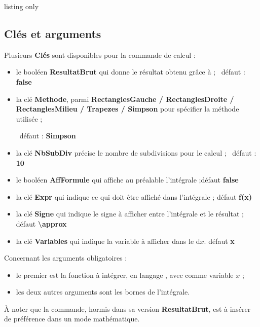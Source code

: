 \documentclass[a4paper,french,11pt]{article}
\newcommand\ctex[1]{\tcbox[vignettelatex]{#1}}
\newcommand\Cle[1]{{\bfseries\sffamily\textlangle \textcolor{orange!75!black}{#1}\textrangle}}
\begin{document}
\begin{PresCodeTexPL}{listing only}
\end{PresCodeTexPL}

\subsection{Clés et arguments}

\begin{cautionblock}
Plusieurs \Cle{Clés} sont disponibles pour la commande de calcul :

\begin{itemize}
	\item le booléen \Cle{ResultatBrut} qui donne le résultat obtenu grâce à \ctex{xint} ; \hfill~défaut : \Cle{false}
	\item la clé \Cle{Methode}, parmi \Cle{RectanglesGauche / RectanglesDroite / RectanglesMilieu / Trapezes / Simpson} pour spécifier la méthode utilisée ;
	
	\hfill~défaut : \Cle{Simpson}
	\item la clé \Cle{NbSubDiv} précise le nombre de subdivisions pour le calcul ; \hfill~défaut : \Cle{10}
	\item le booléen \Cle{AffFormule} qui affiche au préalable l'intégrale ;\hfill{}défaut \Cle{false}
	\item la clé \Cle{Expr} qui indique ce qui doit être affiché dans l'intégrale ; \hfill{}défaut \Cle{f(x)}
	\item la clé \Cle{Signe} qui indique le signe à afficher entre l'intégrale et le résultat ; \hfill{}défaut \Cle{\textbackslash approx}
	\item la clé \Cle{Variables} qui indique la variable à afficher dans le $\text{d}x$. \hfill{}défaut \Cle{x}
\end{itemize}

\smallskip

Concernant les arguments obligatoires :

\begin{itemize}
	\item le premier est la fonction à intégrer, en langage \ctex{xint}, avec comme variable $x$ ;
	\item les deux autres arguments sont les bornes de l'intégrale.
\end{itemize}

À noter que la commande, hormis dans sa version \Cle{ResultatBrut}, est à insérer de préférence dans un mode mathématique.
\end{cautionblock}
\end{document}
